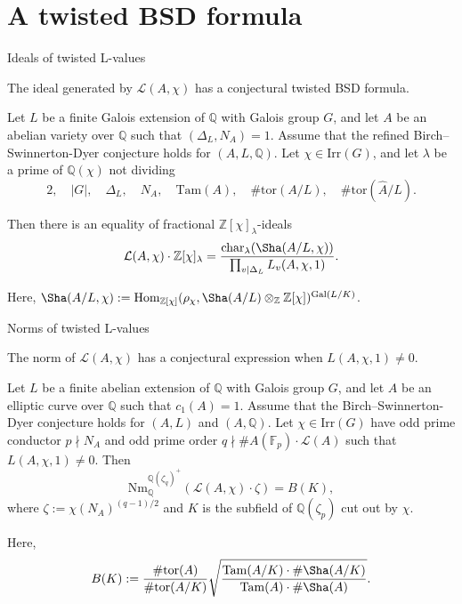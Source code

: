 \documentclass[10pt]{beamer}
\begin{document}
\section{A twisted BSD formula}

\begin{frame}[t]{Ideals of twisted L-values}

The ideal generated by $ \mathcal{L}(A, \chi) $ has a conjectural twisted BSD formula.

\pause

\begin{theorem}
Let $ L $ be a finite Galois extension of $ \mathbb{Q} $ with Galois group $ G $, and let $ A $ be an abelian variety over $ \mathbb{Q} $ such that $ (\Delta_L, N_A) = 1 $. Assume that the refined Birch--Swinnerton-Dyer conjecture holds for $ (A, L, \mathbb{Q}) $. Let $ \chi \in \mathrm{Irr}(G) $, and let $ \lambda $ be a prime of $ \mathbb{Q}(\chi) $ not dividing
$$ 2, \quad |G|, \quad \Delta_L, \quad N_A, \quad \mathrm{Tam}(A), \quad \#\mathrm{tor}(A / L), \quad \#\mathrm{tor}(\widehat{A} / L). $$

\pause

Then there is an equality of fractional $ \mathbb{Z}[\chi]_\lambda $-ideals
$$ \mathcal{L}(A, \chi) \cdot \mathbb{Z}[\chi]_\lambda = \dfrac{\mathrm{char}_\lambda(\Sha(A / L, \chi))}{\prod_{v \mid \Delta_L} L_v(A, \chi, 1)}. $$
\end{theorem}

Here, $ \Sha(A / L, \chi) := \mathrm{Hom}_{\mathbb{Z}[\chi]}(\rho_\chi, \Sha(A / L) \otimes_\mathbb{Z} \mathbb{Z}[\chi])^{\mathrm{Gal}(L / K)} $.

\end{frame}

\begin{frame}[t]{Norms of twisted L-values}

The norm of $ \mathcal{L}(A, \chi) $ has a conjectural expression when $ L(A, \chi, 1) \ne 0 $.

\pause

\begin{theorem}
Let $ L $ be a finite abelian extension of $ \mathbb{Q} $ with Galois group $ G $, and let $ A $ be an elliptic curve over $ \mathbb{Q} $ such that $ c_1(A) = 1 $. Assume that the Birch--Swinnerton-Dyer conjecture holds for $ (A, L) $ and $ (A, \mathbb{Q}) $. Let $ \chi \in \mathrm{Irr}(G) $ have odd prime conductor $ p \nmid N_A $ and odd prime order $ q \nmid \#A(\mathbb{F}_p) \cdot \mathcal{L}(A) $ such that $ L(A, \chi, 1) \ne 0 $. \pause Then
$$ \mathrm{Nm}_\mathbb{Q}^{\mathbb{Q}(\zeta_q)^+}(\mathcal{L}(A, \chi) \cdot \zeta) = B(K), $$
where $ \zeta := \chi(N_A)^{(q - 1) / 2} $ and $ K $ is the subfield of $ \mathbb{Q}(\zeta_p) $ cut out by $ \chi $.
\end{theorem}

Here,
$$ B(K) := \dfrac{\#\mathrm{tor}(A)}{\#\mathrm{tor}(A / K)}\sqrt{\dfrac{\mathrm{Tam}(A / K) \cdot \#\Sha(A / K)}{\mathrm{Tam}(A) \cdot \#\Sha(A)}}. $$

\end{frame}
\end{document}
